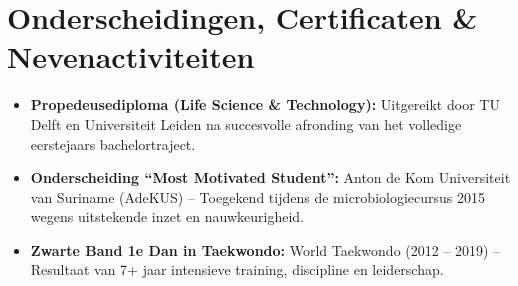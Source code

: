 \documentclass[letterpaper,11pt]{article}
\newcommand{\resumeItem}[1]{
  \item\normalsize{#1}
}
\newcommand{\resumeItemListStart}{\begin{itemize}[leftmargin=0.15in, topsep=0.5pt, itemsep=0.5pt, parsep=0pt]}
\newcommand{\resumeItemListEnd}{\end{itemize}}
\begin{document}
\section{Onderscheidingen, Certificaten \& Nevenactiviteiten}
\resumeItemListStart
\resumeItem{\textbf{Propedeusediploma (Life Science \& Technology):} Uitgereikt door TU Delft en Universiteit Leiden na succesvolle afronding van het volledige eerstejaars bachelortraject.}
\resumeItem{\textbf{Onderscheiding ``Most Motivated Student'':} Anton de Kom Universiteit van Suriname (AdeKUS) -- Toegekend tijdens de microbiologiecursus 2015 wegens uitstekende inzet en nauwkeurigheid.}
\resumeItem{\textbf{Zwarte Band 1e Dan in Taekwondo:} World Taekwondo (2012 -- 2019) -- Resultaat van 7+ jaar intensieve training, discipline en leiderschap.}
\resumeItemListEnd
\end{document}
